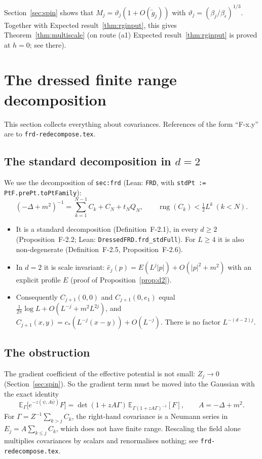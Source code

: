 \documentclass[11pt]{amsart}
\theoremstyle{definition}
\theoremstyle{remark}
\numberwithin{equation}{section}
\newcommand{\E}{\mathbb{E}}
\newcommand{\rng}{\operatorname{rng}}
\newcommand{\frd}{\texttt{frd-redecompose.tex}}
\begin{document}
Section~\ref{sec:spin} shows that $M_j=\vartheta_j(1+O(\check g_j))$ with
$\vartheta_j=(\beta_j/\beta_\epsilon)^{1/3}$. Together with Expected result~\ref{thm:rginput},
this gives Theorem~\ref{thm:multiscale} (on route (a1) Expected result~\ref{thm:rginput} is proved at $h=0$; see there).

\section{The dressed finite range decomposition}
\label{sec:frd}

This section collects everything about covariances. References of the form ``F-x.y'' are to
\frd{}.

\subsection{The standard decomposition in $d=2$}
We use the decomposition of \texttt{sec:frd} (Lean: \texttt{FRD}, with
\texttt{stdPt := PtF.prePt.toPtFamily}):
\[
  (-\Delta+m^2)^{-1}=\sum_{k=1}^{N-1}C_k+C_N+t_NQ_N,\qquad\rng(C_k)<\tfrac12L^k\ (k<N).
\]
\begin{itemize}
\item It is a standard decomposition (Definition~F-2.1), in every $d\ge2$
  (Proposition~F-2.2; Lean: \texttt{DressedFRD.frd\_stdFull}). For $L\ge4$ it is also
  non-degenerate (Definition~F-2.5, Proposition~F-2.6).
\item In $d=2$ it is scale invariant: $\hat e_j(p)=E(L^j|p|)+O(|p|^2+m^2)$ with an explicit
  profile $E$ (proof of Proposition~\ref{prop:d2}).
\item Consequently $C_{j+1}(0,0)$ and $C_{j+1}(0,e_1)$ equal $\frac1{2\pi}\log L+O(L^{-j}+m^2L^{2j})$,
  and $C_{j+1}(x,y)=c_*(L^{-j}(x-y))+O(L^{-j})$. There is no factor $L^{-(d-2)j}$.
\end{itemize}

\subsection{The obstruction}
The gradient coefficient of the effective potential is not small: $Z_j\to0$ (Section~\ref{sec:spin}).
So the gradient term must be moved into the Gaussian with the exact identity
\begin{equation}\label{e:absorb}
  \E_\Gamma\bigl[e^{-z(\psi,A\bar\psi)}F\bigr]=\det(1+zA\Gamma)\,\E_{\Gamma(1+zA\Gamma)^{-1}}[F],
  \qquad A=-\Delta+m^2 .
\end{equation}
For $\Gamma=Z^{-1}\sum_{k>j}C_k$, the right-hand covariance is a Neumann series in
$E_j=A\sum_{k\le j}C_k$, which does not have finite range. Rescaling the field alone multiplies
covariances by scalars and renormalises nothing; see \frd{}.
\end{document}
